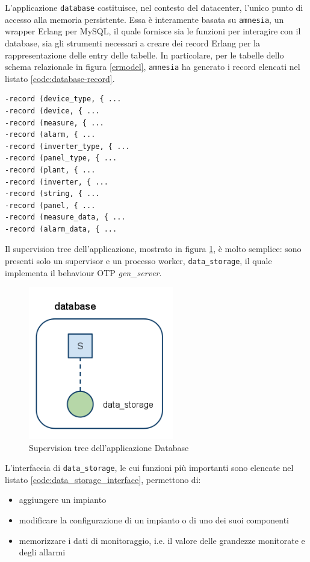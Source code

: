 %
L'applicazione \texttt{database} costituisce, nel contesto del datacenter, 
l'unico punto di accesso alla memoria persistente.
%
Essa \`e interamente basata su \texttt{amnesia}\cite{erl-amnesia}, un wrapper Erlang 
per MySQL, il quale fornisce sia le funzioni per interagire con il database, 
sia gli strumenti necessari a creare dei record Erlang per la rappresentazione 
delle entry delle tabelle.
%
In particolare, per le tabelle dello schema relazionale in figura \ref{ermodel}, 
\texttt{amnesia} ha generato i record elencati nel listato \ref{code:database-record}.
%
\begin{lstlisting}[caption={Record per interfacciamento con il database}, label={code:database-record},frame=trBL]
-record (device_type, { ...
-record (device, { ...
-record (measure, { ...
-record (alarm, { ...
-record (inverter_type, { ...
-record (panel_type, { ...
-record (plant, { ...
-record (inverter, { ...
-record (string, { ...
-record (panel, { ...
-record (measure_data, { ...
-record (alarm_data, { ...
\end{lstlisting}
%
Il supervision tree dell'applicazione, mostrato in figura \ref{database-suptree}, \`e molto 
semplice: sono presenti solo  un supervisor e  un processo worker, 
\texttt{data\_storage}, il quale implementa il behaviour OTP \emph{gen\_server}\cite{gen-server}.
%

%
\begin{figure}[!h]
\centering
\includegraphics[width=180pt]{img/database.png}
\caption{Supervision tree dell'applicazione Database}
\label{database-suptree}
\end{figure}
%

%
L'interfaccia di \texttt{data\_storage}, le cui funzioni pi\`u importanti sono 
elencate nel listato \ref{code:data_storage_interface}, permettono di:
%
\begin{itemize}
\item aggiungere un impianto
\item modificare la configurazione di un impianto o di uno dei suoi componenti
\item memorizzare i dati di monitoraggio, i.e. il valore delle grandezze monitorate e degli allarmi
\end{itemize}
%

